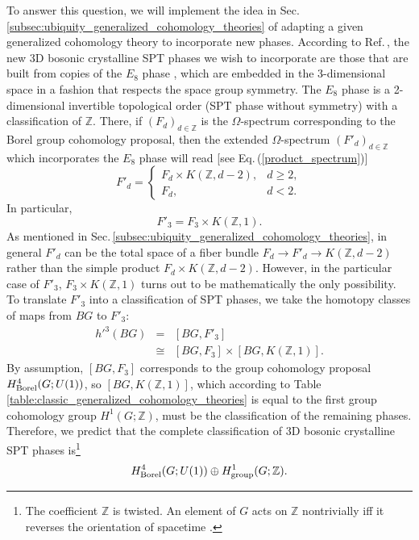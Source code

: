 \documentclass[sort&compress]{elsarticle}
\theoremstyle{theoremstyle}
\theoremstyle{framedtheoremstyle}
\theoremstyle{definitionstyle}
\theoremstyle{definitionstyle}
\theoremstyle{definitionstyle}
\theoremstyle{definitionstyle}
\theoremstyle{nameddefinitionstyle}
\theoremstyle{framednameddefinitionstyle}
\theoremstyle{proofstyle}
\theoremstyle{definitionstyle}
\newcommand{\fromto}{\rightarrow}
\newcommand{\ZZZ}{\mathbb{Z}}
\newcommand{\isomorphic}{\cong}
\begin{document}
To answer this question, we will implement the idea in Sec.\,\ref{subsec:ubiquity_generalized_cohomology_theories} of adapting a given generalized cohomology theory to incorporate new phases. According to Ref.\,\cite{Huang_dimensional_reduction}, the new 3D bosonic crystalline SPT phases we wish to incorporate are those that are built from copies of the $E_8$ phase \cite{Kitaev_honeycomb, 2dChiralBosonicSPT, Kitaev_KITP}, which are embedded in the 3-dimensional space in a fashion that respects the space group symmetry. The $E_8$ phase is a 2-dimensional invertible topological order (SPT phase without symmetry) with a classification of $\ZZZ$. There, if $(F_d)_{d\in \ZZZ}$ is the $\Omega$-spectrum corresponding to the Borel group cohomology proposal, then the extended $\Omega$-spectrum $(F'_d)_{d\in \ZZZ}$ which incorporates the $E_8$ phase will read [see Eq.\,(\ref{product_spectrum})]
\begin{equation}
F'_d = \begin{cases}
F_d \times K(\ZZZ, d-2), & d \geq 2, \\
F_d, & d < 2.
\end{cases}
\end{equation}
In particular,
\begin{equation}
F'_3 = F_3 \times K(\ZZZ, 1).
\end{equation}
As mentioned in Sec.\,\ref{subsec:ubiquity_generalized_cohomology_theories}, in general $F'_d$ can be the total space of a fiber bundle $F_d \fromto F'_d \fromto K(\ZZZ, d-2)$ rather than the simple product $F_d \times K(\ZZZ, d-2)$. However, in the particular case of $F'_3$, $F_3 \times K(\ZZZ, 1)$ turns out to be mathematically the only possibility. To translate $F'_3$ into a classification of SPT phases, we take the homotopy classes of maps from $BG$ to $F'_3$:
\begin{eqnarray}
h'^3(BG) &=& [BG, F'_3] \nonumber\\
&\isomorphic& [BG, F_3] \times [BG, K(\ZZZ,1)].
\end{eqnarray}
By assumption, $[BG, F_3]$ corresponds to the group cohomology proposal $H^4_{\rm Borel}(G;U(1))$, so $[BG, K(\ZZZ,1)]$, which according to Table \ref{table:classic_generalized_cohomology_theories} is equal to the first group cohomology group $H^1(G;\ZZZ)$, must be the classification of the remaining phases. Therefore, we predict that the complete classification of 3D bosonic crystalline SPT phases is\footnote{The coefficient $\ZZZ$ is twisted. An element of $G$ acts on $\ZZZ$ nontrivially iff it reverses the orientation of spacetime \cite{Jiang_sgSPT, Thorngren_sgSPT}.}
\begin{equation}
H^4_{\rm Borel}(G;U(1)) \oplus H^1_{\rm group}(G;\ZZZ). \label{prediction}
\end{equation}
\end{document}
